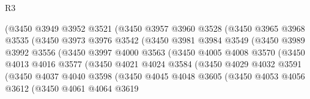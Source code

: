 \begin{lexlean}{R3}
\begin{coremodule}
                      (@3450
                        @3949
                        @3952
                        @3521
                        (@3450
                          @3957
                          @3960
                          @3528
                          (@3450
                            @3965
                            @3968
                            @3535
                            (@3450
                              @3973
                              @3976
                              @3542
                              (@3450
                                @3981
                                @3984
                                @3549
                                (@3450
                                  @3989
                                  @3992
                                  @3556
                                  (@3450
                                    @3997
                                    @4000
                                    @3563
                                    (@3450
                                      @4005
                                      @4008
                                      @3570
                                      (@3450
                                        @4013
                                        @4016
                                        @3577
                                        (@3450
                                          @4021
                                          @4024
                                          @3584
                                          (@3450
                                            @4029
                                            @4032
                                            @3591
                                            (@3450
                                              @4037
                                              @4040
                                              @3598
                                              (@3450
                                                @4045
                                                @4048
                                                @3605
                                                (@3450
                                                  @4053
                                                  @4056
                                                  @3612
                                                  (@3450
                                                    @4061
                                                    @4064
                                                    @3619

\end{coremodule}
\end{lexlean}
